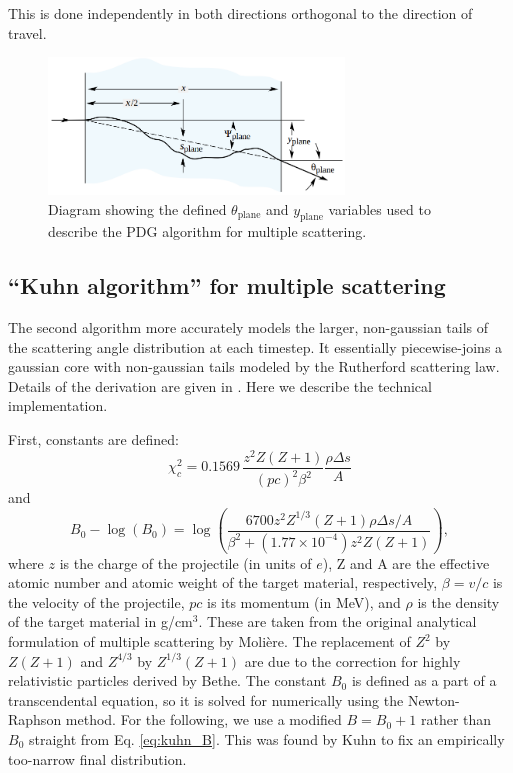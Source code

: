 \documentclass[11pt]{article}
\begin{document}
This is done independently in both directions orthogonal to the direction of travel.

\begin{figure}
\centering
\includegraphics[width=0.7\textwidth]{plots/pdg_msc_diagram.png}
\caption{Diagram showing the defined $\theta_\text{plane}$ and $y_\text{plane}$ variables used to describe the PDG algorithm for multiple scattering.}
\label{fig:mscangles}
\end{figure}

\subsection{``Kuhn algorithm'' for multiple scattering}
\label{sec:kuhn_msc}

The second algorithm more accurately models the larger, non-gaussian tails of the scattering angle distribution at each timestep. It essentially
piecewise-joins a gaussian core with non-gaussian tails modeled by the Rutherford scattering law. Details of the derivation are given 
in \cite{kuhn_msc}. Here we describe the technical implementation.

First, constants are defined:
\begin{equation}\label{eq:kuhn_chi}
\chi_c^2 = 0.1569\,\frac{z^2Z(Z+1)}{(pc)^2\beta^2}\frac{\rho\Delta s}{A}
\end{equation}
and
\begin{equation}\label{eq:kuhn_B}
B_0-\log(B_0) = \log\left(\frac{6700z^2Z^{1/3}(Z+1)\rho\Delta s/A}{\beta^2+(1.77\times10^{-4})z^2Z(Z+1)}\right),
\end{equation}
where $z$ is the charge of the projectile (in units of $e$), 
Z and A are the effective atomic number and atomic weight of the target material, respectively, 
$\beta=v/c$ is the velocity of the projectile, $pc$ is its momentum (in MeV), and
$\rho$ is the density of the target material in g/cm$^3$. 
These are taken from the original analytical formulation of multiple scattering by Moli\`ere. The replacement
of $Z^2$ by $Z(Z+1)$ and $Z^{4/3}$ by $Z^{1/3}(Z+1)$ are due to the correction for highly relativistic particles
derived by Bethe. The constant $B_0$ is defined as a part of a transcendental equation, so it is solved for
numerically using the Newton-Raphson method. For the following, we use a modified $B=B_0+1$
rather than $B_0$ straight from Eq. \ref{eq:kuhn_B}. 
This was found by Kuhn to fix an empirically too-narrow final distribution.
\end{document}
